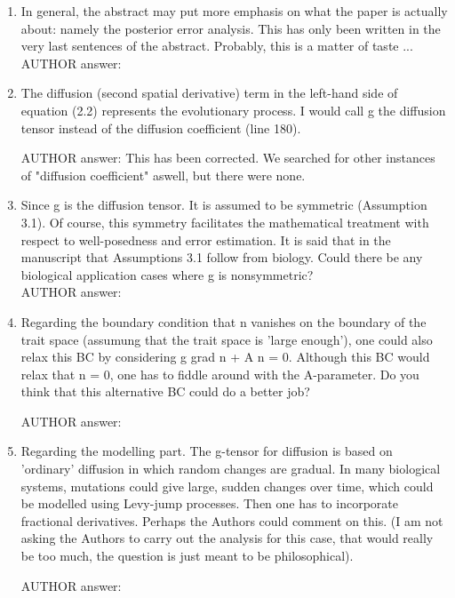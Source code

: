 \documentclass[a4paper,11pt]{scrartcl}
\begin{document}
\begin{enumerate}
\item
In general, the abstract may put more emphasis on what the paper is actually about: namely the posterior error analysis. This has only been written in the very last sentences of the abstract. Probably, this is a matter of taste ... \\

AUTHOR answer:

\item
The diffusion (second spatial derivative) term in the left-hand side of equation (2.2) represents the evolutionary process. I would call g the diffusion tensor instead of the diffusion coefficient (line 180).

AUTHOR answer: This has been corrected. We searched for other instances of "diffusion coefficient" aswell, but there were none.

\item
Since g is the diffusion tensor. It is assumed to be symmetric (Assumption 3.1). Of course, this symmetry facilitates the mathematical treatment with respect to well-posedness and error estimation. It is said that in the manuscript that Assumptions 3.1 follow from biology. Could there be any biological application cases where g is nonsymmetric? \\

AUTHOR answer:

\item
Regarding the boundary condition that n vanishes on the boundary of the trait space (assumung that the trait space is 'large enough'), one could also relax this BC by considering g grad n + A n = 0. Although this BC would relax that n = 0, one has to fiddle around with the A-parameter. Do you think that this alternative BC could do a better job?

AUTHOR answer:

\item
Regarding the modelling part. The g-tensor for diffusion is based on 'ordinary' diffusion in which random changes are gradual. In many biological systems, mutations could give large, sudden changes over time, which could be modelled using Levy-jump processes. Then one has to incorporate fractional derivatives. Perhaps the Authors could comment on this. (I am not asking the Authors to carry out the analysis for this case, that would really be too much, the question is just meant to be philosophical).

AUTHOR answer:


\end{enumerate}
\end{document}
